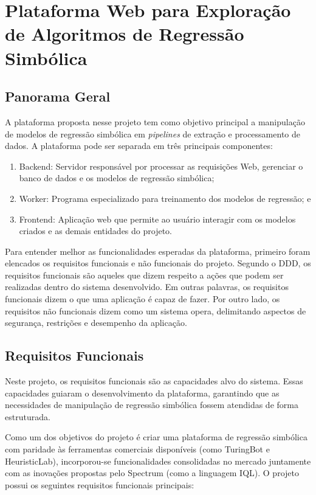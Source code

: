 \chapter{Plataforma Web para Exploração de Algoritmos de Regressão Simbólica}

\section{Panorama Geral}
A plataforma proposta nesse projeto tem como objetivo principal a manipulação de modelos de regressão simbólica em \textit{pipelines} de extração e processamento de dados. A plataforma pode ser separada em três principais componentes:
\begin{enumerate}
    \item Backend: Servidor responsável por processar as requisições Web, gerenciar o banco de dados e os modelos de regressão simbólica;
    \item Worker: Programa especializado para treinamento dos modelos de regressão; e
    \item Frontend: Aplicação web que permite ao usuário interagir com os modelos criados e as demais entidades do projeto.
\end{enumerate}

Para entender melhor as funcionalidades esperadas da plataforma, primeiro foram elencados os requisitos funcionais e não funcionais do projeto. Segundo o DDD, os requisitos funcionais são aqueles que dizem respeito a ações que podem ser realizadas dentro do sistema desenvolvido. Em outras palavras, os requisitos funcionais dizem o que uma aplicação é capaz de fazer. Por outro lado, os requisitos não funcionais dizem como um sistema opera, delimitando aspectos de segurança, restrições e desempenho da aplicação.

\section{Requisitos Funcionais}
Neste projeto, os requisitos funcionais são as capacidades alvo do sistema. Essas capacidades guiaram o desenvolvimento da plataforma, garantindo que as necessidades de manipulação de regressão simbólica fossem atendidas de forma estruturada.

Como um dos objetivos do projeto é criar uma plataforma de regressão simbólica com paridade às ferramentas comerciais disponíveis (como TuringBot e HeuristicLab), incorporou-se funcionalidades consolidadas no mercado juntamente com as inovações propostas pelo Spectrum (como a linguagem IQL). O projeto possui os seguintes requisitos funcionais principais:

